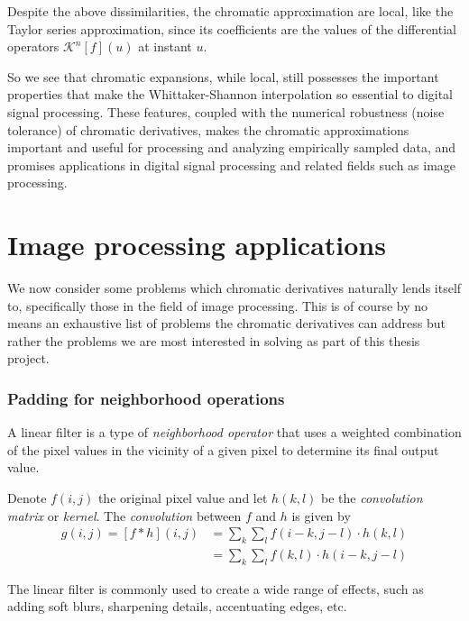 \documentclass[11pt,oneside]{book}
\theoremstyle{plain}
\theoremstyle{definition}
\theoremstyle{remark}
\begin{document}
Despite the above dissimilarities, the chromatic approximation are local, 
like the Taylor series approximation,  since its coefficients are the values 
of the differential operators $\mathcal{K}^n[f](u)$ at instant $u$.

So we see that chromatic expansions, while local, still possesses the important 
properties that make the Whittaker-Shannon interpolation so essential to 
digital signal processing. These features, coupled with the numerical robustness
(noise tolerance) of chromatic derivatives, makes the chromatic approximations
important and useful for processing and analyzing empirically sampled data, 
and promises applications in digital signal processing and related fields 
such as image processing. 

\section{Image processing applications} \label{image_applications}

We now consider some problems which chromatic derivatives naturally
lends itself to, specifically those in the field of image processing. This
is of course by no means an exhaustive list of problems the chromatic derivatives 
can address but rather the problems we are most interested in solving
as part of this thesis project. 

\subsubsection{Padding for neighborhood operations}

A linear filter is a type of \emph{neighborhood operator} that uses a weighted 
combination of the pixel values in the vicinity of a given pixel to determine 
its final output value.

Denote $f(i, j)$ the original pixel value and let $h(k, l)$ be the 
\emph{convolution matrix} or \emph{kernel}. The \emph{convolution} between 
$f$ and $h$ is given by
\begin{align} \label{eq:linear_filter_convolution}
  g(i, j) = [f \ast h](i, j)  &= \sum_k \sum_l f(i-k, j-l) \cdot h(k, l) \\
                &= \sum_k \sum_l f(k, l) \cdot h(i-k, j-l)  \nonumber
\end{align}

The linear filter is commonly used to create a wide range of effects, 
such as adding  soft blurs, sharpening details, accentuating edges, etc.
\end{document}
